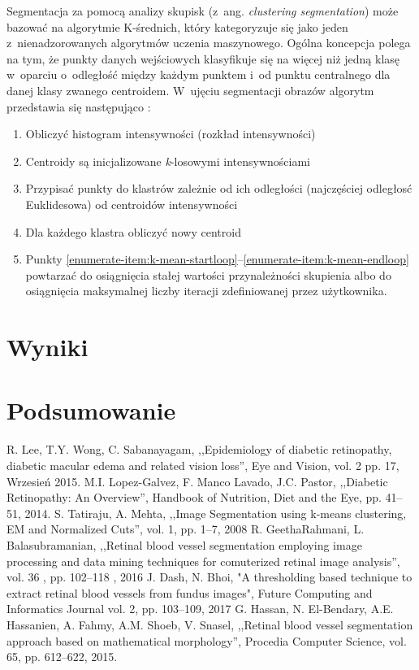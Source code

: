 \documentclass[conference]{IEEEtran}
\begin{document}
Segmentacja za pomocą analizy skupisk (z~ang. \textit{clustering segmentation}) może bazować na algorytmie K-średnich, który kategoryzuje się jako jeden z~nienadzorowanych algorytmów uczenia maszynowego. Ogólna koncepcja polega na tym, że punkty danych wejściowych klasyfikuje się na więcej niż jedną klasę w~oparciu o~odległość między każdym punktem i~od punktu centralnego dla danej klasy zwanego centroidem.
W~ujęciu segmentacji obrazów algorytm przedstawia się następująco \cite{b5}:
\begin{enumerate}
\item Obliczyć histogram intensywności (rozkład intensywności)
\item Centroidy są inicjalizowane \textit{k}-losowymi intensywnościami
\item  Przypisać punkty do klastrów zależnie od ich odległości (najczęściej odległosć Euklidesowa) od centroidów intensywności
\label{enumerate-item:k-mean-startloop}
\item \label{enumerate-item:k-mean-endloop}Dla każdego klastra obliczyć nowy centroid
\item Punkty \ref{enumerate-item:k-mean-startloop}--\ref{enumerate-item:k-mean-endloop} powtarzać do osiągnięcia stałej wartości przynależności skupienia albo do osiągnięcia maksymalnej liczby iteracji zdefiniowanej przez użytkownika.
\end{enumerate}


\section{Wyniki}

\section{Podsumowanie}

\begin{thebibliography}{00}
 R. Lee, T.Y. Wong, C. Sabanayagam, ,,Epidemiology of diabetic retinopathy, diabetic macular edema and related vision loss'', Eye and Vision, vol. 2 pp. 17, Wrzesień 2015.
 M.I. Lopez-Galvez, F. Manco Lavado, J.C. Pastor, ,,Diabetic Retinopathy: An Overview'', Handbook of Nutrition, Diet and the Eye, pp. 41--51, 2014.
 S. Tatiraju, A. Mehta, ,,Image Segmentation using k-means clustering, EM and Normalized Cuts'', vol. 1, pp. 1--7, 2008
 R. GeethaRahmani, L. Balasubramanian, ,,Retinal blood vessel segmentation employing image processing and data mining techniques for comuterized retinal image analysis'', vol. 36 , pp. 102--118 , 2016
 J. Dash, N. Bhoi, "A thresholding based technique to extract retinal blood vessels from fundus images", Future Computing and Informatics Journal vol. 2, pp. 103--109, 2017 
 G. Hassan, N. El-Bendary, A.E. Hassanien, A. Fahmy, A.M. Shoeb, V. Snasel, ,,Retinal blood vessel segmentation approach based on mathematical morphology'', Procedia Computer Science, vol. 65, pp. 612--622, 2015.

\end{thebibliography}
\end{document}
